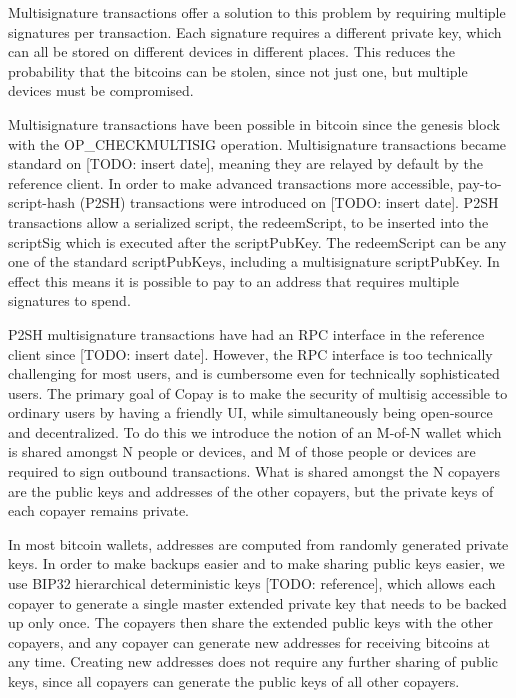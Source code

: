 \documentclass{article}
\begin{document}
Multisignature transactions offer a solution to this problem by requiring multiple signatures per transaction.
Each signature requires a different private key, which can all be stored on different devices in different places.
This reduces the probability that the bitcoins can be stolen, since not just one, but multiple devices must be compromised.

Multisignature transactions have been possible in bitcoin since the genesis block with the OP\_CHECKMULTISIG operation. Multisignature transactions became standard on [TODO: insert date], meaning they are relayed by default by the reference client.
In order to make advanced transactions more accessible, pay-to-script-hash (P2SH) transactions were introduced on [TODO: insert date].
P2SH transactions allow a serialized script, the redeemScript, to be inserted into the scriptSig which is executed after the scriptPubKey.
The redeemScript can be any one of the standard scriptPubKeys, including a multisignature scriptPubKey.
In effect this means it is possible to pay to an address that requires multiple signatures to spend.

P2SH multisignature transactions have had an RPC interface in the reference client since [TODO: insert date].
However, the RPC interface is too technically challenging for most users, and is cumbersome even for technically sophisticated users.
The primary goal of Copay is to make the security of multisig accessible to ordinary users by having a friendly UI, while simultaneously being open-source and decentralized.
To do this we introduce the notion of an M-of-N wallet which is shared amongst N people or devices, and M of those people or devices are required to sign outbound transactions.
What is shared amongst the N copayers are the public keys and addresses of the other copayers, but the private keys of each copayer remains private.

In most bitcoin wallets, addresses are computed from randomly generated private keys.
In order to make backups easier and to make sharing public keys easier, we use BIP32 hierarchical deterministic keys [TODO: reference], which allows each copayer to generate a single master extended private key that needs to be backed up only once.
The copayers then share the extended public keys with the other copayers, and any copayer can generate new addresses for receiving bitcoins at any time.
Creating new addresses does not require any further sharing of public keys, since all copayers can generate the public keys of all other copayers.
\end{document}

